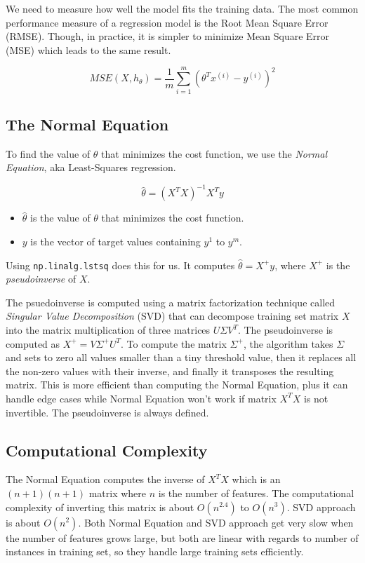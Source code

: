 \documentclass[letterpaper]{article}
\begin{document}
We need to measure how well the model fits the training data. The most common performance measure of a regression model is the Root Mean Square Error (RMSE). Though, in practice, it is simpler to minimize Mean Square Error (MSE) which leads to the same result. 

\[ MSE(X, h_{\theta}) = \frac{1}{m} \sum_{i = 1}^{m} (\theta^{T}x^{(i)} - y^{(i)})^{2} \]

\subsection{The Normal Equation}
To find the value of $\theta$ that minimizes the cost function, we use the \textsl{Normal Equation}, aka Least-Squares regression. 

\[ \hat{\theta} = (X^{T}X)^{-1}X^{T}y \]

\begin{itemize}
	\item $\hat{\theta}$ is the value of $\theta$ that minimizes the cost function. 
	\item $y$ is the vector of target values containing $y^{1}$ to $y^{m}$. 
\end{itemize}

Using \texttt{np.linalg.lstsq} does this for us. It computes $\hat{\theta} = X^{+}y$, where $X^{+}$ is the \textsl{pseudoinverse} of $X$. 


The psuedoinverse is computed using a matrix factorization technique called \textsl{Singular Value Decomposition} (SVD) that can decompose training set matrix $X$ into the matrix multiplication of three matrices $U \Sigma V^{T}$. The pseudoinverse is computed as $X^{+} = V\Sigma^{+}U^{T}$. To compute the matrix $\Sigma^{+}$, the algorithm takes $\Sigma$ and sets to zero all values smaller than a tiny threshold value, then it replaces all the non-zero values with their inverse, and finally it transposes the resulting matrix. This is more efficient than computing the Normal Equation, plus it can handle edge cases while Normal Equation won't work if matrix $X^{T}X$ is not invertible. The pseudoinverse is always defined. 

\subsection{Computational Complexity}
The Normal Equation computes the inverse of $X^{T}X$ which is an $(n+1)(n+1)$ matrix where $n$ is the number of features. The computational complexity of inverting this matrix is about $O(n^{2.4})$ to $O(n^{3})$. SVD approach is about $O(n^{2})$. Both Normal Equation and SVD approach get very slow when the number of features grows large, but both are linear with regards to number of instances in training set, so they handle large training sets efficiently. 
\end{document}
